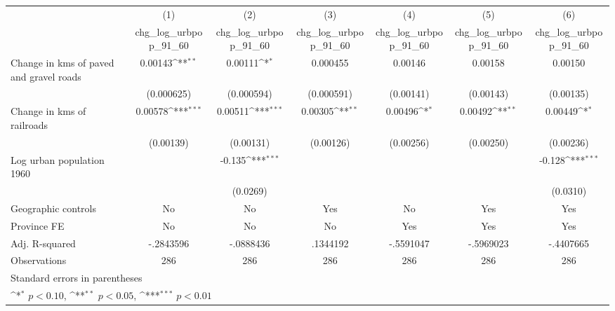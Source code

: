 {
\def\sym#1{\ifmmode^{#1}\else\(^{#1}\)\fi}
\begin{tabular}{l*{6}{c}}
\hline\hline
                    &\multicolumn{1}{c}{(1)}&\multicolumn{1}{c}{(2)}&\multicolumn{1}{c}{(3)}&\multicolumn{1}{c}{(4)}&\multicolumn{1}{c}{(5)}&\multicolumn{1}{c}{(6)}\\
                    &\multicolumn{1}{c}{chg\_log\_urbpop\_91\_60}&\multicolumn{1}{c}{chg\_log\_urbpop\_91\_60}&\multicolumn{1}{c}{chg\_log\_urbpop\_91\_60}&\multicolumn{1}{c}{chg\_log\_urbpop\_91\_60}&\multicolumn{1}{c}{chg\_log\_urbpop\_91\_60}&\multicolumn{1}{c}{chg\_log\_urbpop\_91\_60}\\
\hline
Change in kms of paved and gravel roads&     0.00143\sym{**} &     0.00111\sym{*}  &    0.000455         &     0.00146         &     0.00158         &     0.00150         \\
                    &  (0.000625)         &  (0.000594)         &  (0.000591)         &   (0.00141)         &   (0.00143)         &   (0.00135)         \\
[1em]
Change in kms of railroads&     0.00578\sym{***}&     0.00511\sym{***}&     0.00305\sym{**} &     0.00496\sym{*}  &     0.00492\sym{**} &     0.00449\sym{*}  \\
                    &   (0.00139)         &   (0.00131)         &   (0.00126)         &   (0.00256)         &   (0.00250)         &   (0.00236)         \\
[1em]
Log urban population 1960&                     &      -0.135\sym{***}&                     &                     &                     &      -0.128\sym{***}\\
                    &                     &    (0.0269)         &                     &                     &                     &    (0.0310)         \\
\hline
Geographic controls &          No         &          No         &         Yes         &          No         &         Yes         &         Yes         \\
Province FE         &          No         &          No         &          No         &         Yes         &         Yes         &         Yes         \\
Adj. R-squared      &   -.2843596         &   -.0888436         &    .1344192         &   -.5591047         &   -.5969023         &   -.4407665         \\
Observations        &         286         &         286         &         286         &         286         &         286         &         286         \\
\hline\hline
\multicolumn{7}{l}{\footnotesize Standard errors in parentheses}\\
\multicolumn{7}{l}{\footnotesize \sym{*} \(p<0.10\), \sym{**} \(p<0.05\), \sym{***} \(p<0.01\)}\\
\end{tabular}
}
